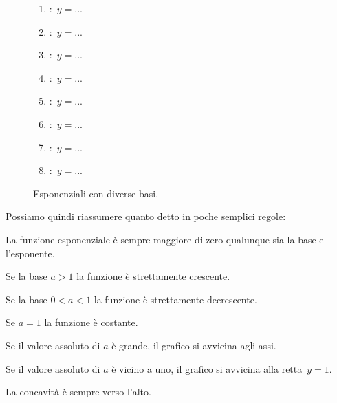 \vspace{5pt}

\begin{figure}[h]
\begin{minipage}{.69\textwidth}
 \begin{inaccessibleblock}
  \espdiversebasi
\end{inaccessibleblock}
\end{minipage}
\hspace{12pt}
\begin{minipage}{.20\textwidth}
 \begin{enumerate} [label=\alph*]
   \item :~$y=...$
   \item :~$y=...$
   \item :~$y=...$
   \item :~$y=...$
   \item :~$y=...$
   \item :~$y=...$
   \item :~$y=...$
   \item :~$y=...$
 \end{enumerate}
\end{minipage}
  \caption{Esponenziali con diverse basi.} \label{fig:diversebasi}
\end{figure}

\newpage %

Possiamo quindi riassumere quanto detto in poche semplici regole: 
\begin{enumerate*}
 \item La funzione esponenziale è sempre maggiore di zero qualunque sia la base 
e l'esponente.
 \item Se la base $a>1$ la funzione è strettamente crescente.
 \item Se la base $0<a<1$ la funzione è strettamente decrescente.
 \item Se $a=1$ la funzione è costante.
 \item Se il valore assoluto di $a$ è grande, il grafico si avvicina agli assi.
 \item Se il valore assoluto di $a$ è vicino a uno, il grafico si avvicina alla 
retta~\(y=1\).
 \item La concavità è sempre verso l'alto.
\end{enumerate*}

